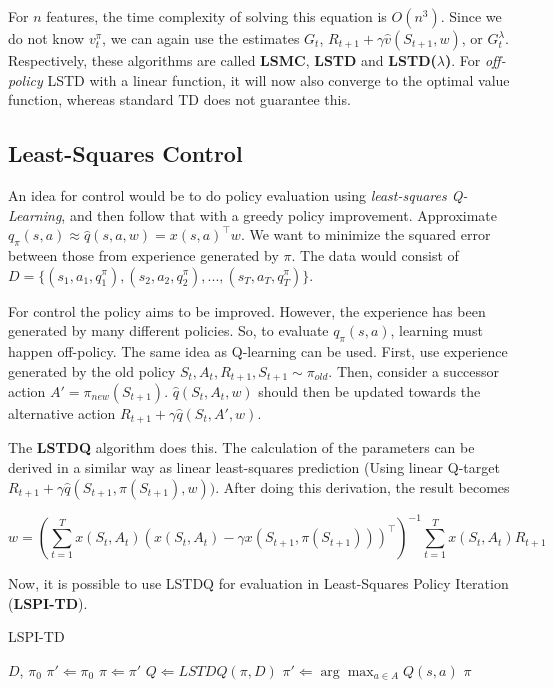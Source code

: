 For $n$ features, the time complexity of solving this equation is $O(n^3)$. Since we do not know $v^\pi_t$, we can again use the estimates $G_t$, $R_{t+1} + \gamma \hat{v}(S_{t+1}, w)$, or $G_t^\lambda$. Respectively, these algorithms are called \textbf{LSMC}, \textbf{LSTD} and \textbf{LSTD($\lambda$)}. For \textit{off-policy} LSTD with a linear function, it will now also converge to the optimal value function, whereas standard TD does not guarantee this.

\subsection{Least-Squares Control}

An idea for control would be to do policy evaluation using \textit{least-squares Q-Learning}, and then follow that with a greedy policy improvement. Approximate $q_\pi(s, a) \approx \hat{q}(s, a, w) = x(s, a)^\intercal w$. We want to minimize the squared error between those from experience generated by $\pi$. The data would consist of $D = \{(s_1, a_1, q_1^\pi), (s_2, a_2, q_2^\pi), ..., (s_T, a_T, q_T^\pi)\}$.

For control the policy aims to be improved. However, the experience has been generated by many different policies. So, to evaluate $q_\pi(s, a)$, learning must happen off-policy. The same idea as Q-learning can be used. First, use experience generated by the old policy $S_t, A_t, R_{t+1}, S_{t+1} \sim \pi_{old}$. Then, consider a successor action $A' = \pi_{new}(S_{t+1})$. $\hat{q}(S_t, A_t, w)$ should then be updated towards the alternative action $R_{t+1} + \gamma \hat{q}(S_t, A', w)$.

The \textbf{LSTDQ} algorithm does this. The calculation of the parameters can be derived in a similar way as linear least-squares prediction (Using linear Q-target $R_{t+1} + \gamma \hat{q}(S_{t+1}, \pi(S_{t+1}), w))$. After doing this derivation, the result becomes

\begin{equation*}
	w = \left(\sum^T_{t = 1} x(S_t, A_t)(x(S_t, A_t) - \gamma x(S_{t+1}, \pi(S_{t+1})))^\intercal\right)^{-1} \sum^T_{t = 1} x(S_t, A_t)R_{t+1}
\end{equation*}

Now, it is possible to use LSTDQ for evaluation in Least-Squares Policy Iteration (\textbf{LSPI-TD}).

\begin{algorithm}[H]
	\caption{LSPI-TD}
	\label{alg:LSPI-TD}
	\begin{algorithmic}
		\REQUIRE $D$, $\pi_0$
		\STATE $\pi' \Leftarrow \pi_0$
			\STATE $\pi \Leftarrow \pi'$
			\STATE $Q \Leftarrow LSTDQ(\pi, D)$
				\STATE $\pi' \Leftarrow \arg\max_{a \in A} Q(s, a)$
			\ENDFOR
		\ENDWHILE
		\RETURN $\pi$
	\end{algorithmic}
\end{algorithm}

